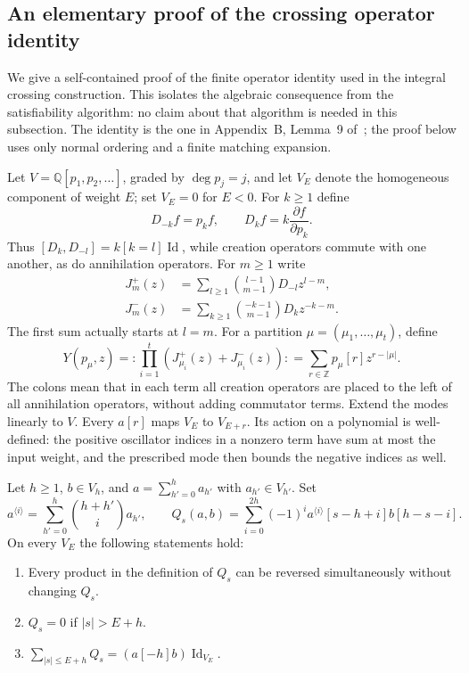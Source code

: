 \subsection{An elementary proof of the crossing operator identity}
\label{sec:elementary-crossing-operator}

We give a self-contained proof of the finite operator identity used in
the integral crossing construction. This isolates the algebraic
consequence from the satisfiability algorithm: no claim about that
algorithm is needed in this subsection. The identity is the one in
Appendix~B, Lemma~9 of~\cite{anthropic2026}; the proof below uses only
normal ordering and a finite matching expansion.

Let $V=\mathbb Q[p_1,p_2,\ldots]$, graded by $\deg p_j=j$, and let
$V_E$ denote the homogeneous component of weight $E$; set $V_E=0$
for $E<0$. For $k\ge1$ define
\[
 D_{-k}f=p_kf,\qquad D_kf=k\frac{\partial f}{\partial p_k}.
\]
Thus $[D_k,D_{-l}]=k[k=l]\operatorname{Id}$, while creation
operators commute with one another, as do annihilation operators.
For $m\ge1$ write
\begin{align*}
 J_m^+(z)&=\sum_{l\ge1}\binom{l-1}{m-1}D_{-l}z^{l-m},\\
 J_m^-(z)&=\sum_{k\ge1}\binom{-k-1}{m-1}D_kz^{-k-m}.
\end{align*}
The first sum actually starts at $l=m$. For a partition
$\mu=(\mu_1,\ldots,\mu_t)$, define
\[
 Y(p_\mu,z)=:\!\prod_{i=1}^t
       (J_{\mu_i}^+(z)+J_{\mu_i}^-(z))\!:
       =\sum_{r\in\mathbb Z}p_\mu[r]z^{r-|\mu|}.
\]
The colons mean that in each term all creation operators are placed
to the left of all annihilation operators, without adding commutator
terms. Extend the modes linearly to $V$. Every $a[r]$ maps
$V_E$ to $V_{E+r}$. Its action on a polynomial is well-defined:
the positive oscillator indices in a nonzero term have sum at most
the input weight, and the prescribed mode then bounds the negative
indices as well.

\begin{lemma}
\label{lem:elementary-crossing-operator}
Let $h\ge1$, $b\in V_h$, and $a=\sum_{h'=0}^h a_{h'}$ with
$a_{h'}\in V_{h'}$. Set
\[
 a^{\langle i\rangle}=\sum_{h'=0}^h\binom{h+h'}i a_{h'},\qquad
 Q_s(a,b)=\sum_{i=0}^{2h}(-1)^i
    a^{\langle i\rangle}[s-h+i]b[h-s-i].
\]
On every $V_E$ the following statements hold:
\begin{enumerate}
\item Every product in the definition of $Q_s$ can be reversed
simultaneously without changing $Q_s$.
\item $Q_s=0$ if $|s|>E+h$.
\item $\sum_{|s|\le E+h}Q_s=(a[-h]b)\operatorname{Id}_{V_E}$.
\end{enumerate}
\end{lemma}

